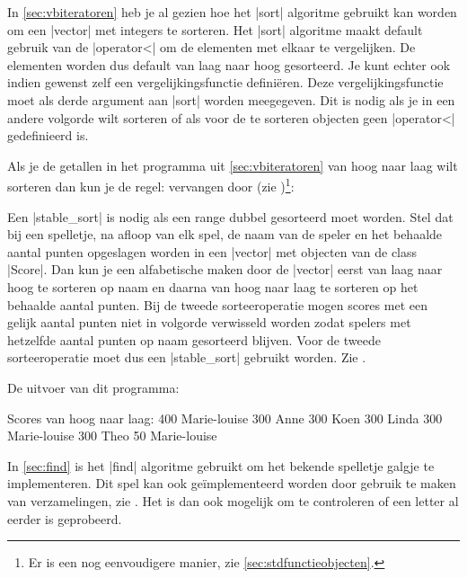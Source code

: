 \begin{cpplstShortInline}
\label{sec:sort}
In \cref{sec:vbiteratoren} heb je al gezien hoe het |sort| algoritme gebruikt kan worden om een |vector| met integers te sorteren.
Het |sort| algoritme maakt default gebruik van de |operator<| om de elementen met elkaar te vergelijken.
De elementen worden dus default van laag naar hoog gesorteerd.
Je kunt echter ook indien gewenst zelf een vergelijkingsfunctie definiëren.
Deze vergelijkingsfunctie moet als derde argument aan |sort| worden meegegeven.
Dit is nodig als je in een andere volgorde wilt sorteren of als voor de te sorteren objecten geen |operator<| gedefinieerd is.

Als je de getallen in het programma  uit \cref{sec:vbiteratoren} van hoog naar laag wilt sorteren dan kun je de regel:
vervangen door (zie )\footnote{%
	Er is een nog eenvoudigere manier, zie \cref{sec:stdfunctieobjecten}.
}:

Een |stable_sort| is nodig als een range dubbel gesorteerd moet worden.
Stel dat bij een spelletje, na afloop van elk spel, de naam van de speler en het behaalde aantal punten opgeslagen worden in een |vector| met objecten van de class |Score|.
Dan kun je een alfabetische  maken door de |vector| eerst van laag naar hoog te sorteren op naam en daarna van hoog naar laag te sorteren op het behaalde aantal punten.
Bij de tweede sorteeroperatie mogen scores met een gelijk aantal punten niet in volgorde verwisseld worden zodat spelers met hetzelfde aantal punten op naam gesorteerd blijven.
Voor de tweede sorteeroperatie moet dus een |stable_sort| gebruikt worden.
Zie .


De uitvoer van dit programma:
\begin{coutput}
Scores van hoog naar laag:
  400 Marie-louise
  300 Anne
  300 Koen
  300 Linda
  300 Marie-louise
  300 Theo
   50 Marie-louise
\end{coutput}

\label{sec:includes}
In \cref{sec:find} is het |find| algoritme gebruikt om het bekende spelletje galgje te implementeren.
Dit spel kan ook geïmplementeerd worden door gebruik te maken van verzamelingen, zie .
Het is dan ook mogelijk om te controleren of een letter al eerder is geprobeerd.


\end{cpplstShortInline}
